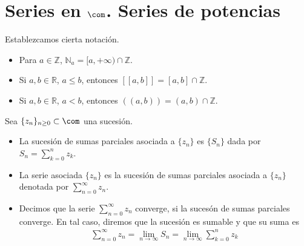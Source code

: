 \chapter{Series en $\com$. Series de potencias}

Establezcamos cierta notación.
\begin{itemize}
    \item Para $a \in \mathbb{Z}$, $\mathbb{N}_a = [a,+\infty) \cap \mathbb{Z}$.
    \item Si $a,b \in \mathbb{R}$, $a \leq b$, entonces $[[a,b]] = [a,b] \cap \mathbb{Z}$.
    \item Si $a,b \in \mathbb{R}$, $a < b$, entonces $((a,b)) = (a,b) \cap \mathbb{Z}$.
\end{itemize}

\begin{defi}
Sea $\{z_n\}_{n \ge 0} \subset \com$ una sucesión.
\begin{itemize}
    \item La sucesión de sumas parciales asociada a $\{z_n\}$ es $\{S_n\}$ dada por $S_n = \sum_{k=0}^{n}{z_k}$.
    \item La serie asociada $\{z_n\}$ es la sucesión de sumas parciales asociada a $\{z_n\}$ denotada por $\sum_{n=0}^{\infty}{z_n}$.
    \item Decimos que la serie $\sum_{n=0}^{\infty}{z_n}$ converge, si la sucesón de sumas parciales converge. En tal caso, diremos que la sucesión es sumable y que su suma es
    \begin{align*}
        \sum_{n=0}^{\infty}{z_n} = \lim_{n \to \infty}{S_n} = \lim_{n \to \infty}\sum_{k=0}^{n}{z_k}
    \end{align*}
\end{itemize}
\end{defi}

